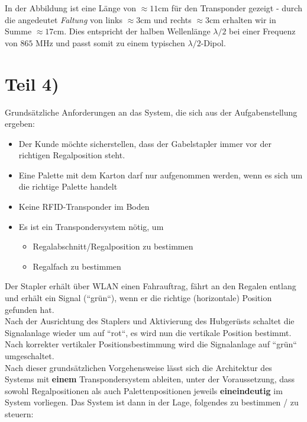 \noindent
In der Abbildung ist eine Länge von $\approx 11$cm für den Transponder gezeigt - durch die angedeutet \textit{Faltung} von links $\approx 3$cm und rechts $\approx 3$cm erhalten wir in Summe $\approx 17$cm.
Dies entspricht der halben Wellenlänge $\lambda / 2$ bei einer Frequenz von $865$ MHz und passt somit zu einem typischen $\lambda/2$-Dipol.


\section{Teil 4)}

Grundsätzliche Anforderungen an das System, die sich aus der Aufgabenstellung ergeben:

\begin{itemize}
    \itemsep0.5em
    \item Der Kunde möchte sicherstellen, dass der Gabelstapler immer vor der richtigen Regalposition steht.
    \item Eine Palette mit dem Karton darf nur aufgenommen werden, wenn es sich um die richtige Palette handelt
    \item Keine RFID-Transponder im Boden
    \item Es ist ein Transpondersystem nötig, um
    \begin{itemize}
        \item Regalabschnitt/Regalposition zu bestimmen
        \item Regalfach zu bestimmen
    \end{itemize}
\end{itemize}

\noindent
Der Stapler erhält über WLAN einen Fahrauftrag, fährt an den Regalen entlang und erhält ein Signal (``grün``), wenn er die richtige (horizontale) Position gefunden hat.\\
Nach der Ausrichtung des Staplers und Aktivierung des Hubgerüsts schaltet die Signalanlage wieder um auf ``rot``, es wird nun die vertikale Position bestimmt.
Nach korrekter vertikaler Positionsbestimmung wird die Signalanlage auf ``grün`` umgeschaltet.\\

\noindent
Nach dieser grundsätzlichen Vorgehensweise lässt sich die Architektur des Systems mit \textbf{einem} Transpondersystem ableiten, unter der Voraussetzung, dass sowohl Regalpositionen als auch Palettenpositionen jeweils \textbf{eineindeutig} im System vorliegen.
Das System ist dann in der Lage, folgendes zu bestimmen / zu steuern:

